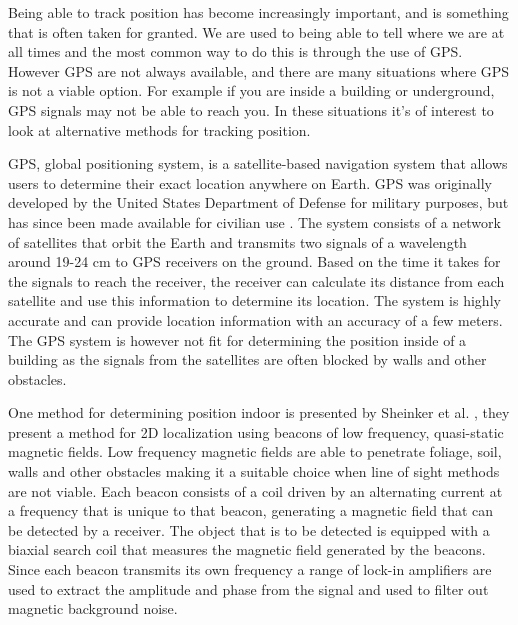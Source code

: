 Being able to track position has become increasingly important, and is something that is often taken for granted.
We are used to being able to tell where we are at all times and the most common way to do this is through the use of GPS.
However GPS are not always available, and there are many situations where GPS is not a viable option.
For example if you are inside a building or underground, GPS signals may not be able to reach you.
In these situations it's of interest to look at alternative methods for tracking position.

GPS, global positioning system, is a satellite-based navigation system that allows users to determine their exact location anywhere on Earth.
GPS was originally developed by the United States Department of Defense for military purposes, but has since been made available for civilian use \cite{GPS}.
The system consists of a network of satellites that orbit the Earth and transmits two signals of a wavelength around 19-24 cm to GPS receivers on the ground.
Based on the time it takes for the signals to reach the receiver, the receiver can calculate its distance from each satellite and use this information to determine its location.
The system is highly accurate and can provide location information with an accuracy of a few meters.
The GPS system is however not fit for determining the position inside of a building as the signals from the satellites are often blocked by walls and other obstacles.

One method for determining position indoor is presented by Sheinker et al. \cite{sheinker2013localization}, they present a method for 2D localization using beacons of low frequency, quasi-static magnetic fields.
Low frequency magnetic fields are able to penetrate foliage, soil, walls and other obstacles making it a suitable choice when line of sight methods are not viable.
Each beacon consists of a coil driven by an alternating current at a frequency that is unique to that beacon, generating a magnetic field that can be detected by a receiver. 
The object that is to be detected is equipped with a biaxial search coil that measures the magnetic field generated by the beacons. 
Since each beacon transmits its own frequency a range of lock-in amplifiers are used to extract the amplitude and phase from the signal and used to filter out magnetic background noise. 

